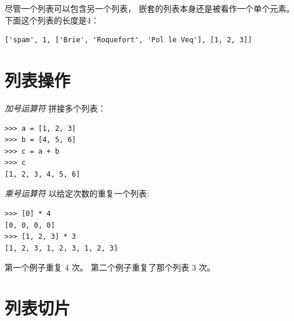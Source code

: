 尽管一个列表可以包含另一个列表， 嵌套的列表本身还是被看作一个单个元素。
下面这个列表的长度是4：
  

\begin{lstlisting}
['spam', 1, ['Brie', 'Roquefort', 'Pol le Veq'], [1, 2, 3]]
\end{lstlisting}


\section{列表操作}


{\em 加号运算符}\li{+} 拼接多个列表：

  

\begin{lstlisting}
>>> a = [1, 2, 3]
>>> b = [4, 5, 6]
>>> c = a + b
>>> c
[1, 2, 3, 4, 5, 6]
\end{lstlisting}

%

{\em 乘号运算符} \li{*} 以给定次数的重复一个列表:
  

\begin{lstlisting}
>>> [0] * 4
[0, 0, 0, 0]
>>> [1, 2, 3] * 3
[1, 2, 3, 1, 2, 3, 1, 2, 3]
\end{lstlisting}

%

第一个例子重复 4 次。  第二个例子重复了那个列表 3 次。

\section{列表切片}
    
  



